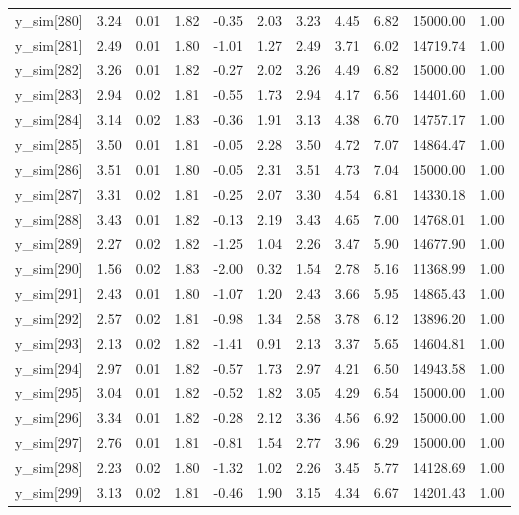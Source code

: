 \begin{table}[ht]
\begin{tabular}{rrrrrrrrrrr}
  y\_sim[280] & 3.24 & 0.01 & 1.82 & -0.35 & 2.03 & 3.23 & 4.45 & 6.82 & 15000.00 & 1.00 \\ 
  y\_sim[281] & 2.49 & 0.01 & 1.80 & -1.01 & 1.27 & 2.49 & 3.71 & 6.02 & 14719.74 & 1.00 \\ 
  y\_sim[282] & 3.26 & 0.01 & 1.82 & -0.27 & 2.02 & 3.26 & 4.49 & 6.82 & 15000.00 & 1.00 \\ 
  y\_sim[283] & 2.94 & 0.02 & 1.81 & -0.55 & 1.73 & 2.94 & 4.17 & 6.56 & 14401.60 & 1.00 \\ 
  y\_sim[284] & 3.14 & 0.02 & 1.83 & -0.36 & 1.91 & 3.13 & 4.38 & 6.70 & 14757.17 & 1.00 \\ 
  y\_sim[285] & 3.50 & 0.01 & 1.81 & -0.05 & 2.28 & 3.50 & 4.72 & 7.07 & 14864.47 & 1.00 \\ 
  y\_sim[286] & 3.51 & 0.01 & 1.80 & -0.05 & 2.31 & 3.51 & 4.73 & 7.04 & 15000.00 & 1.00 \\ 
  y\_sim[287] & 3.31 & 0.02 & 1.81 & -0.25 & 2.07 & 3.30 & 4.54 & 6.81 & 14330.18 & 1.00 \\ 
  y\_sim[288] & 3.43 & 0.01 & 1.82 & -0.13 & 2.19 & 3.43 & 4.65 & 7.00 & 14768.01 & 1.00 \\ 
  y\_sim[289] & 2.27 & 0.02 & 1.82 & -1.25 & 1.04 & 2.26 & 3.47 & 5.90 & 14677.90 & 1.00 \\ 
  y\_sim[290] & 1.56 & 0.02 & 1.83 & -2.00 & 0.32 & 1.54 & 2.78 & 5.16 & 11368.99 & 1.00 \\ 
  y\_sim[291] & 2.43 & 0.01 & 1.80 & -1.07 & 1.20 & 2.43 & 3.66 & 5.95 & 14865.43 & 1.00 \\ 
  y\_sim[292] & 2.57 & 0.02 & 1.81 & -0.98 & 1.34 & 2.58 & 3.78 & 6.12 & 13896.20 & 1.00 \\ 
  y\_sim[293] & 2.13 & 0.02 & 1.82 & -1.41 & 0.91 & 2.13 & 3.37 & 5.65 & 14604.81 & 1.00 \\ 
  y\_sim[294] & 2.97 & 0.01 & 1.82 & -0.57 & 1.73 & 2.97 & 4.21 & 6.50 & 14943.58 & 1.00 \\ 
  y\_sim[295] & 3.04 & 0.01 & 1.82 & -0.52 & 1.82 & 3.05 & 4.29 & 6.54 & 15000.00 & 1.00 \\ 
  y\_sim[296] & 3.34 & 0.01 & 1.82 & -0.28 & 2.12 & 3.36 & 4.56 & 6.92 & 15000.00 & 1.00 \\ 
  y\_sim[297] & 2.76 & 0.01 & 1.81 & -0.81 & 1.54 & 2.77 & 3.96 & 6.29 & 15000.00 & 1.00 \\ 
  y\_sim[298] & 2.23 & 0.02 & 1.80 & -1.32 & 1.02 & 2.26 & 3.45 & 5.77 & 14128.69 & 1.00 \\ 
  y\_sim[299] & 3.13 & 0.02 & 1.81 & -0.46 & 1.90 & 3.15 & 4.34 & 6.67 & 14201.43 & 1.00 \\ 

\end{tabular}
\end{table}
